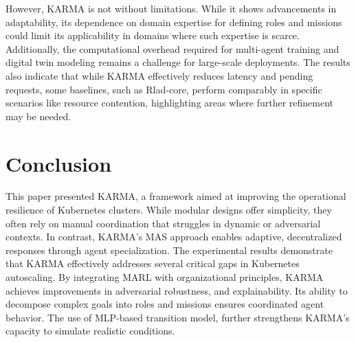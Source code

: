 However, KARMA is not without limitations. While it shows advancements in adaptability, its dependence on domain expertise for defining roles and missions could limit its applicability in domains where such expertise is scarce. Additionally, the computational overhead required for multi-agent training and digital twin modeling remains a challenge for large-scale deployments. The results also indicate that while KARMA effectively reduces latency and pending requests, some baselines, such as Rlad-core, perform comparably in specific scenarios like resource contention, highlighting areas where further refinement may be needed.

\section{Conclusion}
\label{sec:conclusion}

This paper presented KARMA, a framework aimed at improving the operational resilience of Kubernetes clusters. While modular designs offer simplicity, they often rely on manual coordination that struggles in dynamic or adversarial contexts. In contrast, KARMA’s MAS approach enables adaptive, decentralized responses through agent specialization.
The experimental results demonstrate that KARMA effectively addresses several critical gaps in Kubernetes autoscaling. By integrating MARL with organizational principles, KARMA achieves improvements in adversarial robustness, and explainability. Its ability to decompose complex goals into roles and missions ensures coordinated agent behavior. The use of MLP-based transition model, further strengthens KARMA's capacity to simulate realistic conditions.
%
%

